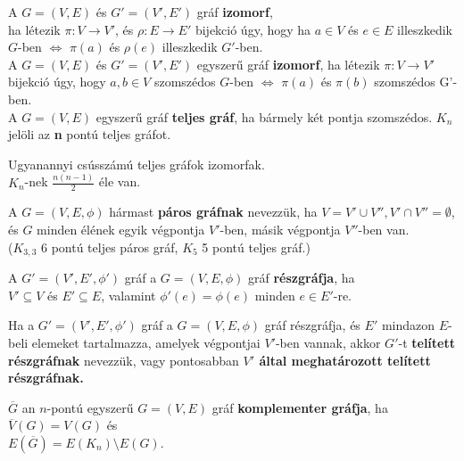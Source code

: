 \documentclass{beamer}
\newcommand{\msmallskip}{\vspace{0.3em}}
\newcommand{\mmedskip}{\vspace{0.5em}}
\newcommand{\mbigskip}{\vspace{1em}}
\begin{document}
\begin{frame}

\begin{tcolorbox}[title={Def.: Gráfok izomorfiája}]
A $G = (V, E)$ és $G' = (V', E')$ gráf \textbf{izomorf},\\
ha létezik ${\pi} : V \rightarrow V'$, és $\rho : E \rightarrow E'$ bijekció úgy, hogy ha $a \in V$ és $e \in E$ illeszkedik $G$-ben $\iff$ ${\pi}(a)$ és ${\rho}(e)$ illeszkedik $G'$-ben.\\
\mbigskip
A $G = (V, E)$ és $G' = (V', E')$ egyszerű gráf \textbf{izomorf}, ha létezik ${\pi} : V \rightarrow V'$ bijekció úgy, hogy $a, b \in V$ szomszédos $G$-ben $\iff$ ${\pi}(a)$ és ${\pi}(b)$ szomszédos G'-ben.\\
\mbigskip
A $G = (V, E)$ egyszerű gráf \textbf{teljes gráf}, ha bármely két pontja szomszédos. \textbf{$K_n$} jelöli az \textbf{n} pontú teljes gráfot.
\end{tcolorbox}

\begin{tcolorbox}[title={Ész}]
Ugyanannyi csússzámú teljes gráfok izomorfak.\\
\mbigskip
$K_n$-nek $\frac{n(n - 1)}{2}$ éle van.
\end{tcolorbox}
\end{frame}

\begin{frame}

\begin{tcolorbox}[title={Def.: Páros Gráf}]
A $G = (V, E, {\phi})$ hármast \textbf{páros gráfnak} nevezzük, ha $V = V' \cup V'', V' \cap V'' = \emptyset$, és $G$ minden élének egyik végpontja $V'$-ben, másik végpontja $V''$-ben van.\\
\mmedskip
($K_{3, 3}$ 6 pontú teljes páros gráf, $K_5$ 5 pontú teljes gráf.)
\end{tcolorbox}
\begin{tcolorbox}[title={Def.: Részgráf}]
A $G' = (V', E', {\phi}')$ gráf a $G = (V, E, {\phi})$ gráf \textbf{részgráfja}, ha\\
$V' \subseteq V$ és $E' \subseteq E$, valamint ${\phi}'(e) = {\phi}(e)$ minden $e \in E'$-re.
\end{tcolorbox}
\begin{tcolorbox}[title={Def.: Telített Részgráf}]
Ha a $G' = (V', E', {\phi}')$ gráf a $G = (V, E, {\phi})$ gráf részgráfja, és $E'$ mindazon $E$-beli elemeket tartalmazza, amelyek végpontjai $V'$-ben vannak, akkor $G'$-t \textbf{telített részgráfnak} nevezzük, vagy pontosabban \textbf{$V'$ által meghatározott telített részgráfnak.}
\end{tcolorbox}
\begin{tcolorbox}[title={Komplementer Gráf}]
$\overline{G}$ an $n$-pontú egyszerű $G = (V, E)$ gráf \textbf{komplementer gráfja}, ha\\
\msmallskip
$\overline{V}(G) = V(G)$ és\\
$E(\overline{G}) = E(K_n) \setminus E(G)$.
\end{tcolorbox}

\end{frame}
\end{document}
